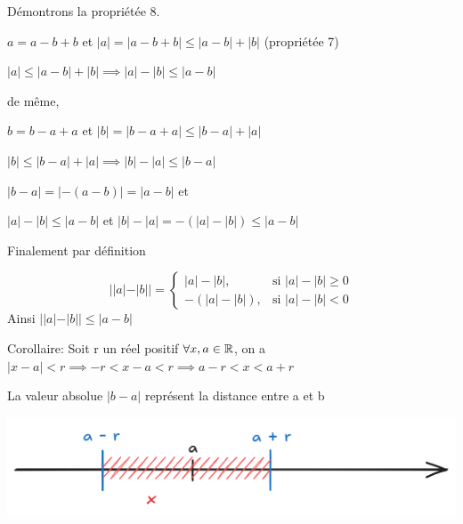 \documentclass[a4paper, 12pt]{article}
\begin{document}
Démontrons la propriétée 8.

\begin{demonstration}
    $a = a - b + b$ \quad et \quad $|a| = |a - b + b| \leq |a - b| + |b|$ (propriétée 7)

    $|a| \leq |a - b| + |b| \implies |a| - |b| \leq |a - b|$

    \vspace{0.5em}
    de même, 
    \vspace{0.5em}
    
    $b = b - a + a$ \quad et \quad $|b| = |b - a + a| \leq |b - a| + |a|$
    
    $|b| \leq |b - a| + |a| \implies |b| - |a| \leq |b - a|$
    
    \vspace{0.5em}

    $|b - a| = |-(a-b)| = |a-b|$ et
    
    $|a| - |b| \leq |a-b|$ \quad et \quad $|b| - |a| = -(|a| - |b|) \leq |a-b|$

    Finalement par définition

    \begin{rdem}
        \begin{equation*}
            ||a|-|b|| =
            \begin{cases}
                |a| - |b|, & \text{si } |a| - |b| \geq 0 \\
                -(|a| - |b|), & \text{si } |a| - |b| \lt 0
            \end{cases}
        \end{equation*}
        Ainsi $||a| - |b|| \leq |a - b|$
    \end{rdem}
\end{demonstration}

Corollaire: Soit r un réel positif $\forall x, a \in \mathbb{R}$, on a 
$|x - a| \lt r \implies -r \lt x - a \lt r \implies a-r \lt x \lt a + r$

\begin{remark}
    La valeur absolue $|b - a|$ représent la distance entre a et b
\end{remark}

\includegraphics[width=\textwidth]{img/neightborhood.png}
\end{document}
